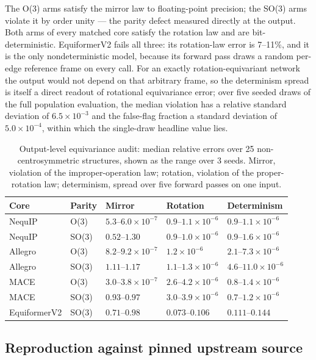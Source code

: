 The O(3) arms satisfy the mirror law to floating-point precision; the SO(3) arms violate it by order unity --- the parity defect measured directly at the output. Both arms of every matched core satisfy the rotation law and are bit-deterministic. EquiformerV2 fails all three: its rotation-law error is 7--11\%, and it is the only nondeterministic model, because its forward pass draws a random per-edge reference frame on every call. For an exactly rotation-equivariant network the output would not depend on that arbitrary frame, so the determinism spread is itself a direct readout of rotational equivariance error; over five seeded draws of the full population evaluation, the median violation has a relative standard deviation of $6.5\times10^{-3}$ and the false-flag fraction a standard deviation of $5.0\times10^{-4}$, within which the single-draw headline value lies.

\begin{table}[htbp]
\centering
\small
\caption{Output-level equivariance audit: median relative errors over 25 non-centrosymmetric structures, shown as the range over 3 seeds. Mirror, violation of the improper-operation law; rotation, violation of the proper-rotation law; determinism, spread over five forward passes on one input.}
\label{stab:e5}
\begin{tabular}{lllll}
\toprule
Core & Parity & Mirror & Rotation & Determinism \\
\midrule
NequIP & O(3) & $5.3$--$6.0\times10^{-7}$ & $0.9$--$1.1\times10^{-6}$ & $0.9$--$1.1\times10^{-6}$ \\
NequIP & SO(3) & $0.52$--$1.30$ & $0.9$--$1.0\times10^{-6}$ & $0.9$--$1.6\times10^{-6}$ \\
Allegro & O(3) & $8.2$--$9.2\times10^{-7}$ & $1.2\times10^{-6}$ & $2.1$--$7.3\times10^{-6}$ \\
Allegro & SO(3) & $1.11$--$1.17$ & $1.1$--$1.3\times10^{-6}$ & $4.6$--$11.0\times10^{-6}$ \\
MACE & O(3) & $3.0$--$3.8\times10^{-7}$ & $2.6$--$4.2\times10^{-6}$ & $0.8$--$1.4\times10^{-6}$ \\
MACE & SO(3) & $0.93$--$0.97$ & $3.0$--$3.9\times10^{-6}$ & $0.7$--$1.2\times10^{-6}$ \\
EquiformerV2 & SO(3) & $0.71$--$0.98$ & $0.073$--$0.106$ & $0.111$--$0.144$ \\
\bottomrule
\end{tabular}
\end{table}

\subsection*{Reproduction against pinned upstream source}

